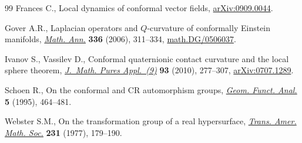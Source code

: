 \documentclass[pdftex]{sigma}
\theoremstyle{plain}
\theoremstyle{definition}
\begin{document}
\begin{thebibliography}{99}
 Frances C.,
 Local dynamics of conformal vector f\/ields,
\href{http://arxiv.org/abs/0909.0044}{arXiv:0909.0044}.

Gover A.R.,
Laplacian operators and $Q$-curvature of conformally Einstein manifolds,
\href{http://dx.doi.org/10.1007/s00208-006-0004-z}{{\it Math. Ann.}} \textbf{336} (2006), 311--334,
\href{http://arxiv.org/abs/math.DG/0506037}{math.DG/0506037}.

 Ivanov S., Vassilev D.,
 Conformal quaternionic contact curvature and the local sphere theorem,
\href{http://dx.doi.org/10.1016/j.matpur.2009.11.002}{{\it J.~Math. Pures Appl.~(9)}} \textbf{93} (2010), 277--307,
\href{http://arxiv.org/abs/0707.1289}{arXiv:0707.1289}.

Schoen R.,
On the conformal and CR automorphism groups,
\href{http://dx.doi.org/10.1007/BF01895676}{{\it Geom. Funct. Anal.}} \textbf{5} (1995),   464--481.

Webster S.M.,
On the transformation group of a real hypersurface,
\href{http://dx.doi.org/10.2307/1997877}{{\it Trans. Amer. Math. Soc.}} \textbf{231} (1977), 179--190.

\end{thebibliography}\LastPageEnding
\end{document}
